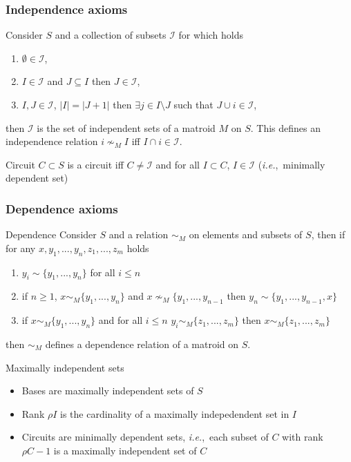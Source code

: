 \documentclass[bigger]{beamer}
\newcommand{\ie}{{\em i.e.},~}
\begin{document}
\begin{frame}
\frametitle{Independence axioms}

\begin{block}
  Consider $S$ and a collection of subsets $\mathscr{I}$ for which
  holds
  \begin{enumerate}{Independence}
  \item $\emptyset \in \mathscr{I}$,
  \item $I \in \mathscr{I}$ and $J \subseteq I$ then $J \in
    \mathscr{I}$,
  \item $I,J \in \mathscr{I}$, $|I| = |J + 1|$ then $\exists j \in I
    \setminus J$ such that $J \cup i \in \mathscr{I}$,
  \end{enumerate}
  then $\mathscr{I}$ is the set of independent sets of a matroid $M$
  on $S$. This defines an independence relation $i \nsim_M I$ iff
  $I\cap i \in \mathscr{I}$. 
\end{block}
\begin{block}{Circuit}
  $C \subset S$ is a circuit iff $C \neq \mathscr{I}$ and for all $I
  \subset C$, $I \in \mathscr{I}$ (\ie minimally dependent set)
\end{block}

\end{frame}

\begin{frame}
\frametitle{Dependence axioms}

\begin{block}{Dependence}
  Consider $S$ and a relation $\sim_M$ on elements and subsets of $S$,
  then if for any $x,y_1,...,y_n,z_1,...,z_m$ holds
  \begin{enumerate}
  \item $y_i \sim \{y_1,...,y_n\}$ for all $i \leq n$
  \item if $n\geq 1$, $x \sim_M \{y_1,...,y_n\}$ and $x \nsim_M
    \{y_1,...,y_{n-1}$ then $y_n \sim \{y_1,...,y_{n-1},x\}$
  \item if $x \sim_M \{y_1,...,y_n\}$ and for all $i \leq n$ $y_i
    \sim_M \{z_1,...,z_m\}$ then $x \sim_M \{z_1,...,z_m\}$
  \end{enumerate}
  then $\sim_M$ defines a dependence relation of a matroid on $S$.
\end{block}

\end{frame}

\begin{frame}{Maximally independent sets}
  \begin{itemize}
  \item Bases are maximally independent sets of $S$
  \item Rank $\rho I$ is the cardinality of a maximally indepedendent set in $I$
  \item Circuits are minimally dependent sets, \ie each subset of $C$
    with rank $\rho C - 1$ is a maximally independent set of $C$
  \end{itemize}
\end{frame}
\end{document}
